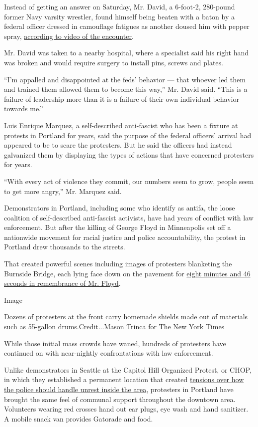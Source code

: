 Instead of getting an answer on Saturday, Mr. David, a 6-foot-2,
280-pound former Navy varsity wrestler, found himself being beaten with
a baton by a federal officer dressed in camouflage fatigues as another
doused him with pepper spray,
\href{https://twitter.com/PDXzane/status/1284726088187310080}{according
to video of the encounter}.

Mr. David was taken to a nearby hospital, where a specialist said his
right hand was broken and would require surgery to install pins, screws
and plates.

``I'm appalled and disappointed at the feds' behavior --- that whoever
led them and trained them allowed them to become this way,'' Mr. David
said. ``This is a failure of leadership more than it is a failure of
their own individual behavior towards me.''

Luis Enrique Marquez, a self-described anti-fascist who has been a
fixture at protests in Portland for years, said the purpose of the
federal officers' arrival had appeared to be to scare the protesters.
But he said the officers had instead galvanized them by displaying the
types of actions that have concerned protesters for years.

``With every act of violence they commit, our numbers seem to grow,
people seem to get more angry,'' Mr. Marquez said.

Demonstrators in Portland, including some who identify as antifa, the
loose coalition of self-described anti-fascist activists, have had years
of conflict with law enforcement. But after the killing of George Floyd
in Minneapolis set off a nationwide movement for racial justice and
police accountability, the protest in Portland drew thousands to the
streets.

That created powerful scenes including images of protesters blanketing
the Burnside Bridge, each lying face down on the pavement for
\href{https://www.nytimes3xbfgragh.onion/2020/06/18/us/george-floyd-timing.html}{eight
minutes and 46 seconds in remembrance of Mr. Floyd}.

Image

Dozens of protesters at the front carry homemade shields made out of
materials such as 55-gallon drums.Credit...Mason Trinca for The New York
Times

While those initial mass crowds have waned, hundreds of protesters have
continued on with near-nightly confrontations with law enforcement.

Unlike demonstrators in Seattle at the Capitol Hill Organized Protest,
or CHOP, in which they established a permanent location that created
\href{https://www.nytimes3xbfgragh.onion/2020/07/01/us/seattle-protest-zone-CHOP-CHAZ-unrest.html}{tensions
over how the police should handle unrest inside the area}, protesters in
Portland have brought the same feel of communal support throughout the
downtown area. Volunteers wearing red crosses hand out ear plugs, eye
wash and hand sanitizer. A mobile snack van provides Gatorade and food.

